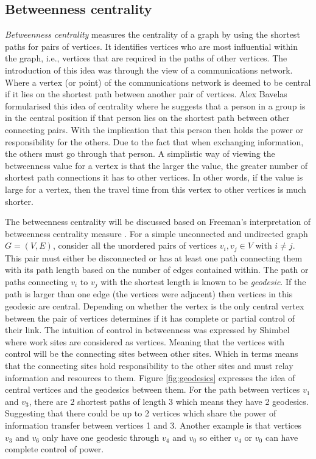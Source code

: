 \subsection{Betweenness centrality}
\emph{Betweenness centrality} measures the centrality of a graph by using the shortest paths for pairs of vertices. It identifies vertices who are most influential within the graph, i.e., vertices that are required in the paths of other vertices. The introduction of this idea was through the view of a communications network. Where a vertex (or point) of the communications network is deemed to be central if it lies on the shortest path between another pair of vertices. Alex Bavelas \cite{bavelas1948mathematical} formularised this idea of centrality where he suggests that a person in a group is in the central position if that person lies on the shortest path between other connecting pairs. With the implication that this person then holds the power or responsibility for the others. Due to the fact that when exchanging information, the others must go through that person. A simplistic way of viewing the betweenness value for a vertex is that the larger the value, the greater number of shortest path connections it has to other vertices. In other words, if the value is large for a vertex, then the travel time from this vertex to other vertices is much shorter. 

The betweenness centrality will be discussed based on Freeman's interpretation of betweenness centrality measure \cite{freeman1977set}. For a simple unconnected and undirected graph $G = (V, E)$, consider all the unordered pairs of vertices $v_i, v_j \in V$ with $i \ne j$. This pair must either be disconnected or has at least one path connecting them with its path length based on the number of edges contained within. The path or paths connecting $v_i$ to $v_j$ with the shortest length is known to be \emph{geodesic}. If the path is larger than one edge (the vertices were adjacent) then vertices in this geodesic are central. Depending on whether the vertex is the only central vertex between the pair of vertices determines if it has complete or partial control of their link. The intuition of control in betweenness was expressed by Shimbel \cite{shimbel1953structural} where work sites are considered as vertices. Meaning that the vertices with control will be the connecting sites between other sites. Which in terms means that the connecting sites hold responsibility to the other sites and must relay information and resources to them. Figure \ref{fig:geodesics} expresses the idea of central vertices and the geodesics between them. For the path between vertices $v_1$ and $v_3$, there are 2 shortest paths of length 3 which means they have 2 geodesics. Suggesting that there could be up to 2 vertices which share the power of information transfer between vertices 1 and 3. Another example is that vertices $v_3$ and $v_6$ only have one geodesic through $v_4$ and $v_0$ so either $v_4$ or $v_0$ can have complete control of power.

